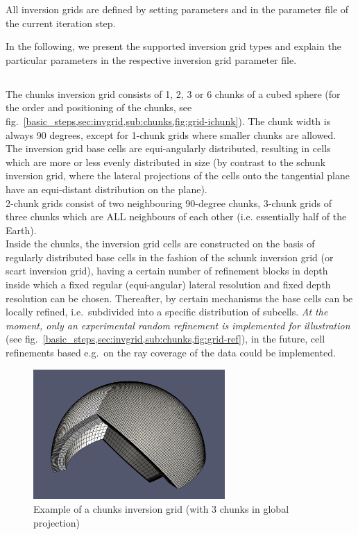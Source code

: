 All inversion grids are defined by setting parameters  and 
 in the parameter file of the current iteration step.

In the following, we present the supported inversion grid types and explain the particular
parameters in the respective inversion grid parameter file.
%
\subsection{} \label{basic_steps,sec:invgrid,sub:chunks}
%
The chunks inversion grid consists of 1, 2, 3 or 6 chunks of a cubed sphere (for the order and positioning
of the chunks, see fig.~\ref{basic_steps,sec:invgrid,sub:chunks,fig:grid-ichunk}). 
The chunk width is always 90 degrees, except for 1-chunk grids
where smaller chunks are allowed. The inversion grid base cells are equi-angularly distributed,
resulting in cells which are more or less evenly distributed in size (by contrast to the 
schunk inversion grid, where the lateral projections of the cells onto the tangential plane
have an equi-distant distribution on the plane).\\ 
2-chunk grids consist of two neighbouring 90-degree chunks, 3-chunk grids of three chunks 
which are ALL neighbours of each other (i.e. essentially half of the Earth).\\
Inside the chunks, the inversion grid cells are constructed on the basis of regularly distributed
base cells in the fashion of the schunk inversion grid (or scart inversion grid), having a certain number of refinement
blocks in depth inside which a fixed regular (equi-angular) lateral resolution and fixed depth resolution can be chosen.
Thereafter, by certain mechanisms the base cells
can be locally refined, i.e.\ subdivided into a specific distribution of subcells.
\emph{At the moment, only an experimental random refinement
is implemented for illustration} (see fig.~\ref{basic_steps,sec:invgrid,sub:chunks,fig:grid-ref}{}),
in the future, cell refinements based e.g.\ on the ray coverage of the data could be implemented.

\begin{figure}[ht]
  \centering
  \includegraphics[width=0.65\textwidth]{images/chunksInversionGrid_manual.png}
  \caption{Example of a chunks inversion grid (with 3 chunks in global projection)}
  \label{basic_steps,sec:invgrid,sub:chunks,fig:grid}
\end{figure}

